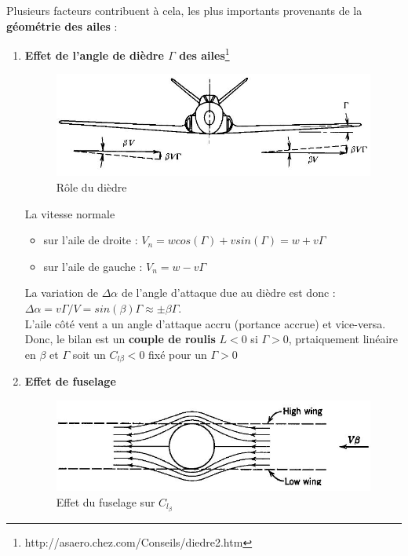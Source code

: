 \documentclass{report}
\begin{document}
Plusieurs facteurs contribuent à cela, les plus importants provenants de la \textbf{géométrie des ailes} :
\begin{enumerate}
    \item \textbf{Effet de l'angle de dièdre $\Gamma$ des ailes}\footnote{http://asaero.chez.com/Conseils/diedre2.htm}\\
    
    \begin{figure}[h!]
    \centering
    \includegraphics[scale=0.6]{32.JPG}
    \caption{Rôle du dièdre}
    \label{32}
    \end{figure}
    
    La vitesse normale \begin{itemize}
        \item  sur l'aile de droite : $V_n=wcos(\Gamma) + vsin(\Gamma) = w+v\Gamma$
        \item sur l'aile de gauche : $V_n = w-v\Gamma$
    \end{itemize}
    La variation de $\Delta\alpha$ de l'angle d'attaque due au dièdre est donc :$\Delta\alpha=v\Gamma/V= sin(\beta)\Gamma\approx \pm\beta\Gamma$.\\
    L'aile côté vent a un angle d'attaque accru (portance accrue) et vice-versa.\\
    Donc, le bilan est un \textbf{couple de roulis} $L<0$ si $\Gamma>0$, prtaiquement linéaire en $\beta$ et $\Gamma$ soit un $C_{l\beta}<0$ fixé pour un $\Gamma>0$
    
    
    \item \textbf{Effet de fuselage}\\
    
    \begin{figure}[h!]
    \centering
    \includegraphics[scale=0.6]{34.JPG}
    \caption{Effet du fuselage sur $C_{l_\beta}$}
    \label{34}
    \end{figure}
    

\end{enumerate}
\end{document}
